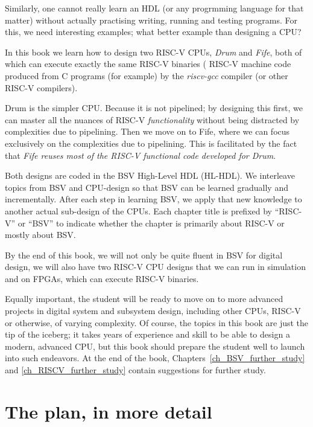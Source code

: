Similarly, one cannot really learn an HDL (or any progrmming language
for that matter) without actually practising writing, running and
testing programs.  For this, we need interesting examples; what better
example than designing a CPU?

In this book we learn how to design two RISC-V CPUs, \emph{Drum} and
\emph{Fife}, both of which can execute exactly the same RISC-V
binaries ({\ie} RISC-V machine code produced from C programs (for
example) by the \emph{riscv-gcc} compiler (or other RISC-V compilers).

Drum is the simpler CPU. Because it is not pipelined; by designing
this first, we can master all the nuances of RISC-V
\emph{functionality} without being distracted by complexities due to
pipelining.  Then we move on to Fife, where we can focus exclusively
on the complexities due to pipelining.  This is facilitated by the
fact that \emph{Fife reuses most of the RISC-V functional code
developed for Drum}.

Both designs are coded in the BSV High-Level HDL (HL-HDL).  We
interleave topics from BSV and CPU-design so that BSV can be learned
gradually and incrementally.  After each step in learning BSV, we
apply that new knowledge to another actual sub-design of the CPUs.
Each chapter title is prefixed by ``RISC-V'' or ``BSV'' to indicate
whether the chapter is primarily about RISC-V or mostly about BSV.

By the end of this book, we will not only be quite fluent in BSV for
digital design, we will also have two RISC-V CPU designs that we can
run in simulation and on FPGAs, {\ie} which can execute RISC-V
binaries.

Equally important, the student will be ready to move on to more
advanced projects in digital system and subsystem design, including
other CPUs, RISC-V or otherwise, of varying complexity.  Of course,
the topics in this book are just the tip of the iceberg; it takes
years of experience and skill to be able to design a modern, advanced
CPU, but this book should prepare the student well to launch into such
endeavors.  At the end of the book,
Chapters~\ref{ch_BSV_further_study} and \ref{ch_RISCV_further_study}
contain suggestions for further study.


\section{The plan, in more detail}

